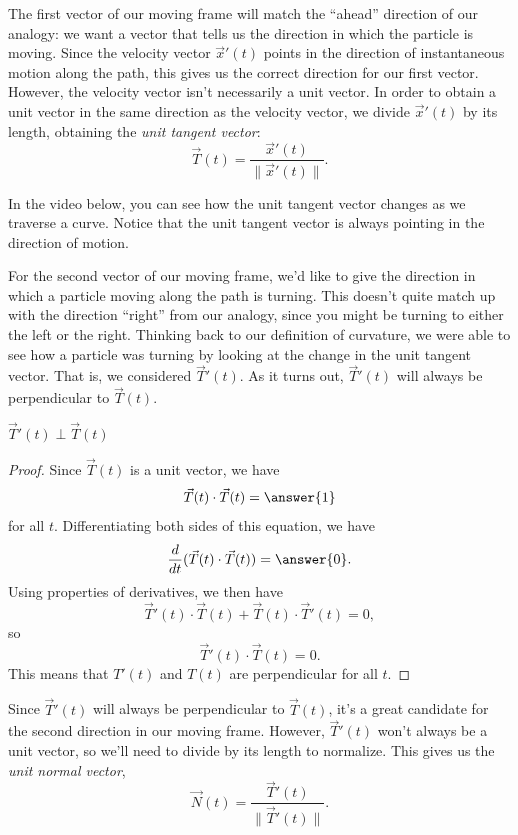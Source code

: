\documentclass{ximera}
\begin{document}
The first vector of our moving frame will match the ``ahead'' direction of our analogy: we want a vector that tells us the direction in which the particle is moving. Since the velocity vector $\vec{x}'(t)$ points in the direction of instantaneous motion along the path, this gives us the correct direction for our first vector. However, the velocity vector isn't necessarily a unit vector. In order to obtain a unit vector in the same direction as the velocity vector, we divide $\vec{x}'(t)$ by its length, obtaining the \emph{unit tangent vector}:
\[
\vec{T}(t) = \dfrac{\vec{x}'(t)}{\|\vec{x}'(t)\|}.
\]

In the video below, you can see how the unit tangent vector changes as we traverse a curve. Notice that the unit tangent vector is always pointing in the direction of motion.


For the second vector of our moving frame, we'd like to give the direction in which a particle moving along the path is turning. This doesn't quite match up with the direction ``right'' from our analogy, since you might be turning to either the left or the right. Thinking back to our definition of curvature, we were able to see how a particle was turning by looking at the change in the unit tangent vector. That is, we considered $\vec{T}'(t)$. As it turns out, $\vec{T}'(t)$ will always be perpendicular to $\vec{T}(t)$.

\begin{proposition}
$\vec{T}'(t)\perp \vec{T}(t)$
\end{proposition}

\begin{proof}
Since $\vec{T}(t)$ is a unit vector, we have
\[
\vec{T}(t)\cdot \vec{T}(t) = \answer{1}
\]
for all $t$. Differentiating both sides of this equation, we have
\[
\frac{d}{dt}(\vec{T}(t)\cdot \vec{T}(t)) = \answer{0}.
\]
Using properties of derivatives, we then have
\[
\vec{T}'(t)\cdot \vec{T}(t) + \vec{T}(t)\cdot \vec{T}'(t)=0,
\]
so
\[
\vec{T}'(t)\cdot \vec{T}(t) = 0.
\]
This means that $T'(t)$ and $T(t)$ are perpendicular for all $t$.
\end{proof}

 Since $\vec{T}'(t)$ will always be perpendicular to $\vec{T}(t)$, it's a great candidate for the second direction in our moving frame. However, $\vec{T}'(t)$ won't always be a unit vector, so we'll need to divide by its length to normalize. This gives us the \emph{unit normal vector},
 \[
 \vec{N}(t) = \dfrac{\vec{T}'(t)}{\|\vec{T}'(t)\|}.
 \]
 
\end{document}
